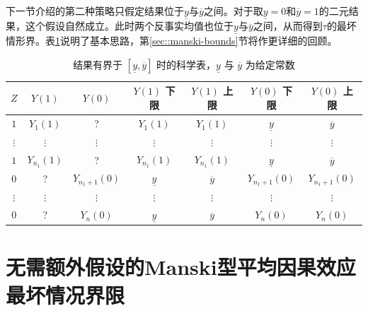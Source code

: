 下一节介绍的第二种策略只假定结果位于$\underline{y}$与$\overline{y}$之间。对于取$\underline{y} = 0$和$\overline{y} = 1$的二元结果，这个假设自然成立。此时两个反事实均值也位于$\underline{y}$与$\overline{y}$之间，从而得到$\tau$的最坏情形界。表\ref{table::manski-bounds}说明了基本思路，第\ref{sec::manski-bounds}节将作更详细的回顾。 


 


 



\begin{table}
\centering
\caption{结果有界于 $ [\underline{y}, \overline{y}]$ 时的科学表，$\underline{y}$ 与 $\overline{y}$ 为给定常数}\label{table::manski-bounds}
\begin{tabular}{ccccccc}
\hline 
$Z$ & $Y(1)$ & $Y(0)$ &  $Y(1)$ 下限 & $Y(1)$ 上限 & $Y(0)$ 下限 & $Y(0)$ 上限 \\
\hline 
$1$ & $Y_1(1)$ & ? & $Y_1(1)$  & $Y_1(1)$ & $\underline{y}$ & $\overline{y}$ \\
$\vdots$&$\vdots$&$\vdots$&$\vdots$&$\vdots$&$\vdots$&$\vdots$   \\
$1$ & $Y_{n_1}(1)$ & ? &  $Y_{n_1}(1)$  & $Y_{n_1}(1)$ & $\underline{y}$ & $\overline{y}$ \\
\hline 
$0$ & ? & $Y_{n_1+1}(0)$ & $\underline{y}$ & $\overline{y}$& $Y_{n_1+1}(0)$ & $Y_{n_1+1}(0)$ \\ 
$\vdots$&$\vdots$&$\vdots$&$\vdots$&$\vdots$&$\vdots$&$\vdots$ \\ 
$0$ & ? & $Y_{n}(0)$ & $\underline{y}$ & $\overline{y}$& $Y_{n}(0)$ & $Y_{n}(0)$ \\
\hline 
\end{tabular}
\end{table}


\section{无需额外假设的Manski型平均因果效应最坏情况界限}\label{subsection::manski-bounds}
\label{sec::manski-bounds}




